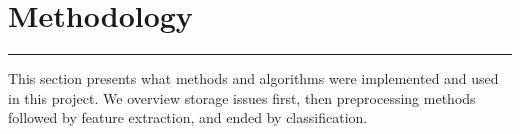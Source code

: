 \section{Methodology}
\noindent
\rule{7.0in}{.013in}

This section presents what methods and algorithms were implemented and used
in this project. We overview storage issues first, then preprocessing
methods followed by feature extraction, and ended by classification.


\clearpage


\clearpage


\clearpage

%


\clearpage
